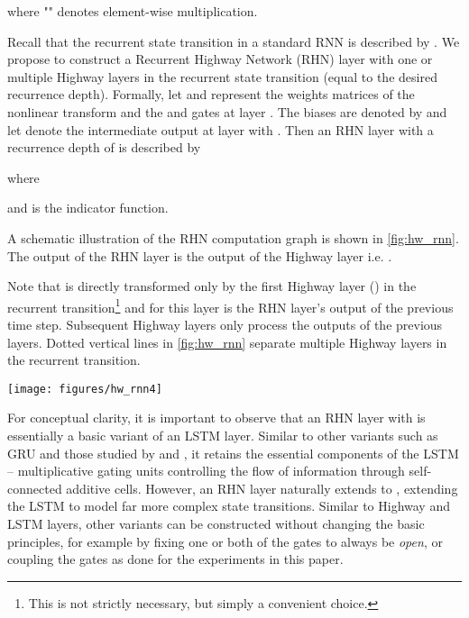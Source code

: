 \documentclass[letterpaper]{article}
\def\srnn{standard RNN}
\def\Arch{Recurrent Highway Network} \def\arch{RHN}
\begin{document}
where "" denotes element-wise multiplication.

Recall that the recurrent state transition in a \srnn{} is described by .
We propose to construct a \Arch{} (\arch{}) layer  with one or multiple Highway layers in the recurrent state transition (equal to the desired recurrence depth). 
Formally, let  and  represent the weights matrices of the  nonlinear transform and the  and  gates at layer .
The biases are denoted by  and let  denote the intermediate output at layer  with .
Then an \arch{} layer with a recurrence depth of  is described by


where

and  is the indicator function.

A schematic illustration of the \arch{} computation graph is shown in \autoref{fig:hw_rnn}.
The output of the \arch{} layer is the output of the  Highway layer i.e. \smash{}.

Note that \smash{} is directly transformed only by the first Highway layer () in the recurrent transition\footnote[1]{This is not strictly necessary, but simply a convenient choice.} and for this layer \smash{} is the \arch{} layer's output of the previous time step.
Subsequent Highway layers only process the outputs of the previous layers.
Dotted vertical lines in \autoref{fig:hw_rnn} separate multiple Highway layers in the recurrent transition. 
\begin{figure*}
\begin{center}
\texttt{[image: figures/hw\_rnn4]} \caption{Schematic showing computation within an \arch{} layer inside the recurrent loop. Vertical dashed lines delimit stacked Highway layers. Horizontal dashed lines imply the extension of the recurrence depth by stacking further layers. ,  \&  are the transformations described in equations \ref{eq:H}, \ref{eq:T} and \ref{eq:C}, respectively.}
\label{fig:hw_rnn}
\end{center}
\end{figure*}

For conceptual clarity, it is important to observe that an \arch{} layer with  is essentially a basic variant of an LSTM layer.
Similar to other variants such as GRU \citep{cho2014} and those studied by \citet{greff2015lstm} and \citet{jozefowicz2015}, it retains the essential components of the LSTM -- multiplicative gating units controlling the flow of information through self-connected additive cells.
However, an \arch{} layer naturally extends to , extending the LSTM to model far more complex state transitions.
Similar to Highway and LSTM layers, other variants can be constructed without changing the basic principles, for example by fixing one or both of the gates to always be \emph{open}, or coupling the gates as done for the experiments in this paper.
\end{document}

